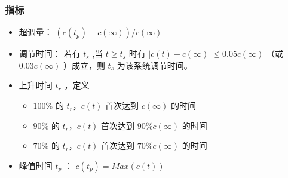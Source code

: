 \documentclass{beamer}
\begin{document}
\begin{frame}
\frametitle{指标}
\label{sec-2-3}

\begin{itemize}
\item 超调量：  $(c(t_p)-c(\infty))/c(\infty)$
\item 调节时间： 若有 $t_s$ ,当 $t\geq t_s$ 时有 $|c(t)-c(\infty)|\leq 0.05c(\infty)$ （或 $0.03c(\infty)$ ）成立，则 $t_s$ 为该系统调节时间。
\item 上升时间 $t_r$ ，定义
\begin{itemize}
\item $100\%$ 的 $t_r，c(t)$ 首次达到 $c(\infty)$ 的时间
\item $90\%$ 的 $t_r，c(t)$ 首次达到 $90\%c(\infty)$ 的时间
\item $70\%$ 的 $t_r，c(t)$ 首次达到 $70\%c(\infty)$ 的时间
\end{itemize}
\item 峰值时间 $t_p$ ： $c(t_p)=Max(c(t))$
\end{itemize}
\end{frame}
\end{document}
